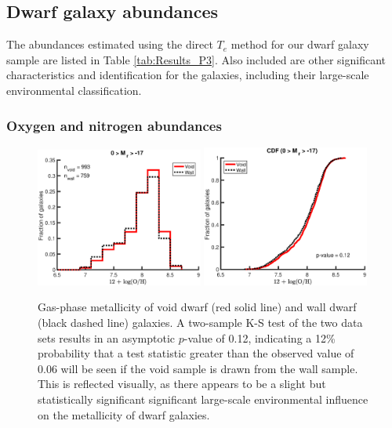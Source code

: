 \subsection{Dwarf galaxy abundances}



The abundances estimated using the direct $T_e$ method for our dwarf galaxy 
sample are listed in Table \ref{tab:Results_P3}.  Also included are other 
significant characteristics and identification for the galaxies, including their 
large-scale environmental classification.


\subsubsection{Oxygen and nitrogen abundances}

\begin{figure}
    \centering
    \includegraphics[width=0.49\textwidth]{Images/Paper3/1sig_dwarf_SF_t3_12logOHrelations_dust_hist}
    \includegraphics[width=0.49\textwidth]{Images/Paper3/1sig_dwarf_SF_t3_12logOHrelations_dust_CDF}
    \caption[O/H distribution for dwarf galaxy sample]{Gas-phase metallicity of 
    void dwarf (red solid line) and wall dwarf (black dashed line) galaxies.  A 
    two-sample K-S test of the two data sets results in an asymptotic $p$-value 
    of 0.12, indicating a 12\% probability that a test statistic greater than 
    the observed value of 0.06 will be seen if the void sample is drawn from the 
    wall sample.  This is reflected visually, as there appears to be a slight 
    but statistically significant significant large-scale environmental 
    influence on the metallicity of dwarf galaxies.}
    \label{fig:met1sig_P3}
\end{figure}

